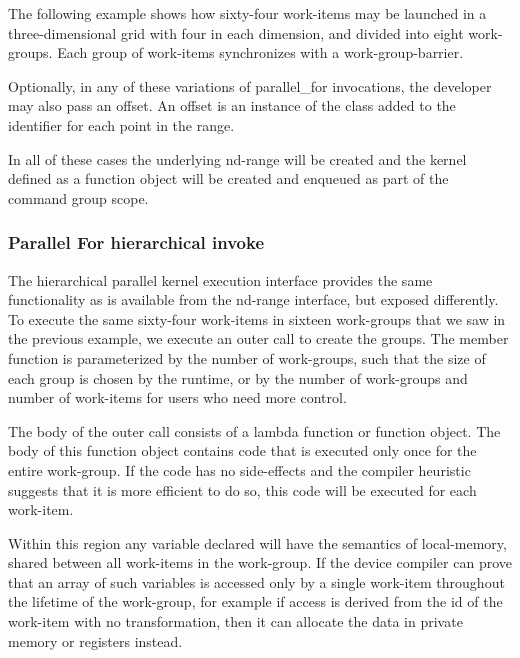 The following example shows how sixty-four work-items may be launched
in a three-dimensional grid with four in each dimension, and divided
into eight work-groups. Each group of work-items synchronizes with a
\gls{work-group-barrier}.



Optionally, in any of these variations of parallel_for invocations,
the developer may also pass an offset. An offset is an
instance of the  class added to the identifier 
for each point in the range.

In all of these cases the underlying \gls{nd-range} will be created
and the kernel defined as a function object will be created and enqueued
as part of the command group scope.


\subsubsection{Parallel For hierarchical invoke}

The hierarchical parallel kernel execution interface provides the same
functionality as is available from the \gls{nd-range} interface, but
exposed differently. To execute the same sixty-four work-items in
sixteen work-groups that we saw in the previous example, we execute an
outer  call to create the
groups. The member function
 is parameterized by the
number of work-groups, such that the size of each group is chosen by
the runtime, or by the number of work-groups and number of work-items
for users who need more control.

The body of the outer  call
consists of a lambda function or function object. The body of this
function object contains code that is executed only once for the
entire work-group. If the code has no side-effects and the compiler
heuristic suggests that it is more efficient to do so, this code will be
executed for each work-item.

Within this region any variable declared will have the semantics of
\gls{local-memory}, shared between all \glspl{work-item} in the 
\gls{work-group}. If the
device compiler can prove that an array of such variables is accessed only by
a single work-item throughout the lifetime of the work-group, for
example if access is derived from the id of the work-item with no
transformation, then it can allocate the data in private memory or
registers instead.

